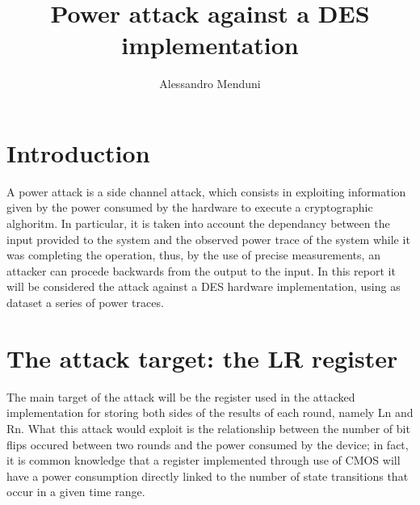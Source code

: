 \documentclass[11pt]{article} %
\title{Power attack against a DES implementation}
\author{Alessandro Menduni}
\begin{document}
\maketitle

\section{Introduction}
A power attack is a side channel attack, which consists in exploiting information given by the power consumed by the hardware to execute a cryptographic alghoritm. In particular, it is taken into account the dependancy between the input provided to the system and the observed power trace of the system while it was completing the operation, thus, by the use of precise measurements, an attacker can procede backwards from the output to the input. In this report it will be considered the attack against a DES hardware implementation, using as dataset a series of power traces.

\section{The attack target: the LR register}
The main target of the attack will be the register used in the attacked implementation for storing both sides of the results of each round, namely Ln and Rn. What this attack would exploit is the relationship between the number of bit flips occured between two rounds and the power consumed by the device; in fact, it is common knowledge that a register implemented through use of CMOS will have a power consumption directly linked to the number of state transitions that occur in a given time range.
\end{document}
